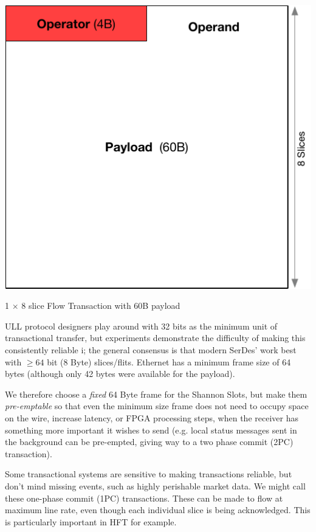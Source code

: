 \documentclass[../../../OAE-SPEC-MAIN.tex]{subfiles}
\begin{document}
\begin{marginfigure}
        \includegraphics[width=\linewidth]{./figures/8-slice-operator.pdf}
  \caption{1 $\times$ 8 slice Flow  Transaction with 60B payload}
\end{marginfigure}

ULL protocol designers play around with 32 bits as the minimum unit of transactional transfer, but experiments demonstrate the difficulty of making this consistently reliable i; the general consensus is that modern SerDes' work best with $\ge 64$ bit (8 Byte) slices/flits.
Ethernet  has a minimum frame size of 64 bytes  (although only 42 bytes were available for the payload).

We therefore choose a \emph{fixed} 64 Byte frame for the Shannon Slots, but make them \emph{pre-emptable} so that even the minimum size frame does not need to occupy space on the wire, increase latency, or FPGA processing steps, when the receiver has something more important it wishes to send (e.g. local status messages sent in the background can be pre-empted, giving way to a two phase commit (2PC) transaction).



Some transactional systems are sensitive to making transactions reliable, but don't mind missing events, such as highly perishable market data.  We might call these one-phase commit (1PC) transactions. These can be made to flow at maximum line rate, even though each individual slice is being acknowledged. This is particularly important in HFT for example.
\end{document}
